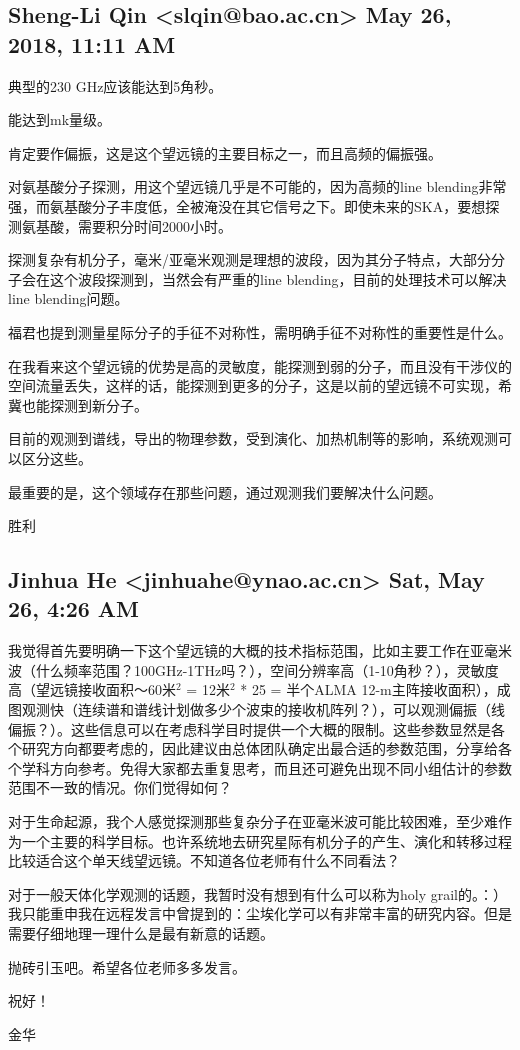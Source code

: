 \documentclass{article}
\newcommand\from[2]{\subsection{{#1} {#2}}}
\newcommand\said[1]{#1}
\begin{document}
\from{
Sheng-Li Qin <slqin@bao.ac.cn>
}{
May 26, 2018, 11:11 AM
}
\said{
典型的230 GHz应该能达到5角秒。

能达到mk量级。

肯定要作偏振，这是这个望远镜的主要目标之一，而且高频的偏振强。

对氨基酸分子探测，用这个望远镜几乎是不可能的，因为高频的line blending非常强，而氨基酸分子丰度低，全被淹没在其它信号之下。即使未来的SKA，要想探测氨基酸，需要积分时间2000小时。

探测复杂有机分子，毫米/亚毫米观测是理想的波段，因为其分子特点，大部分分子会在这个波段探测到，当然会有严重的line blending，目前的处理技术可以解决line blending问题。

福君也提到测量星际分子的手征不对称性，需明确手征不对称性的重要性是什么。

在我看来这个望远镜的优势是高的灵敏度，能探测到弱的分子，而且没有干涉仪的空间流量丢失，这样的话，能探测到更多的分子，这是以前的望远镜不可实现，希冀也能探测到新分子。

目前的观测到谱线，导出的物理参数，受到演化、加热机制等的影响，系统观测可以区分这些。

最重要的是，这个领域存在那些问题，通过观测我们要解决什么问题。

胜利
}

\from{
Jinhua He <jinhuahe@ynao.ac.cn>
}{
Sat, May 26, 4:26 AM
}
\said{
我觉得首先要明确一下这个望远镜的大概的技术指标范围，比如主要工作在亚毫米波（什么频率范围？100GHz-1THz吗？），空间分辨率高（1-10角秒？），灵敏度高（望远镜接收面积～60米$^2$  = 12米$^2$ * 25 = 半个ALMA 12-m主阵接收面积），成图观测快（连续谱和谱线计划做多少个波束的接收机阵列？），可以观测偏振（线偏振？）。这些信息可以在考虑科学目时提供一个大概的限制。这些参数显然是各个研究方向都要考虑的，因此建议由总体团队确定出最合适的参数范围，分享给各个学科方向参考。免得大家都去重复思考，而且还可避免出现不同小组估计的参数范围不一致的情况。你们觉得如何？

对于生命起源，我个人感觉探测那些复杂分子在亚毫米波可能比较困难，至少难作为一个主要的科学目标。也许系统地去研究星际有机分子的产生、演化和转移过程比较适合这个单天线望远镜。不知道各位老师有什么不同看法？

对于一般天体化学观测的话题，我暂时没有想到有什么可以称为holy grail的。：）我只能重申我在远程发言中曾提到的：尘埃化学可以有非常丰富的研究内容。但是需要仔细地理一理什么是最有新意的话题。

抛砖引玉吧。希望各位老师多多发言。

祝好！

金华
}
\end{document}
